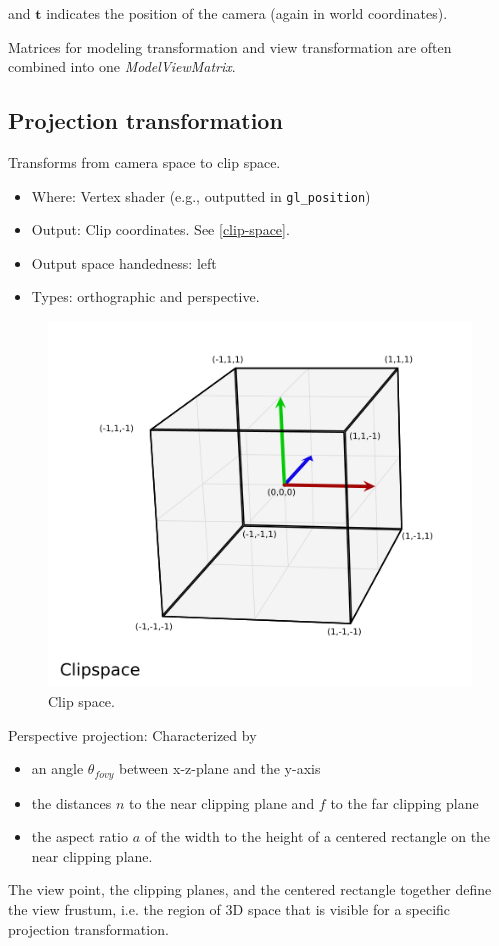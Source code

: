 \documentclass{scrartcl}
\begin{document}
        and $\mathbf{t}$ indicates the position of the camera (again in world coordinates).

        Matrices for modeling transformation and view transformation are often combined into one \textit{ModelViewMatrix}.

    \subsection{Projection transformation}

        Transforms from camera space to clip space.

        \begin{itemize}
            \item Where: Vertex shader (e.g., outputted in \texttt{gl\_position})
            \item Output: Clip coordinates. See \ref{clip-space}.
            \item Output space handedness: left
            \item Types: orthographic and perspective.
        \end{itemize}

        \begin{figure}
            \centering
            \includegraphics[width=0.8\linewidth]{clip-space}
            \caption{Clip space.}
            \label{fig:clip-space}
        \end{figure}

        Perspective projection:
        Characterized by
        \begin{itemize}
            \item an angle $\theta_{fovy}$ between x-z-plane and the y-axis
            \item the distances $n$ to the near clipping plane and $f$ to the far clipping plane
            \item  the aspect ratio $a$ of the width to the height of a centered rectangle on the near clipping plane.
        \end{itemize}
        The view point, the clipping planes, and the centered rectangle together define the view frustum, i.e. the region of 3D space that is visible for a specific projection transformation.
\end{document}
